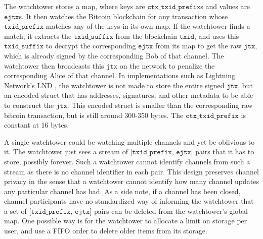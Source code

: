 The watchtower stores a map, where keys are $\texttt{ctx\_txid\_prefix}$s and values are $\texttt{ejtx}$s. It then watches the Bitcoin blockchain for any transaction whose $\texttt{txid\_prefix}$ matches any of the keys in its own map. If the watchtower finds a match, it extracts the $\texttt{txid\_suffix}$ from the blockchain $\texttt{txid}$, and uses this $\texttt{txid\_suffix}$ to decrypt the corresponding $\texttt{ejtx}$ from its map to get the raw $\texttt{jtx}$, which is already signed by the corresponding Bob of that channel. The watchtower then broadcasts this $\texttt{jtx}$ on the network to penalize the corresponding Alice of that channel. In implementations such as Lightning Network's LND \cite{lnd}, the watchtower is not made to store the entire signed $\texttt{jtx}$, but an encoded struct that has addresses, signatures, and other metadata to be able to construct the $\texttt{jtx}$. This encoded struct is smaller than the corresponding raw bitcoin transaction, but is still around 300-350 bytes. The $\texttt{ctx\_txid\_prefix}$ is constant at 16 bytes.

A single watchtower could be watching multiple channels and yet be oblivious to it. The watchtower just sees a stream of \sloppy $\texttt{[txid\_prefix, ejtx]}$ pairs that it has to store, possibly forever. Such a watchtower cannot identify channels from such a stream as there is no channel identifier in each pair. This design preserves channel privacy in the sense that a watchtower cannot identify how many channel updates any particular channel has had. As a side note, if a channel has been closed, channel participants have no standardized way of informing the watchtower that a set of $\texttt{[txid\_prefix, ejtx]}$ pairs can be deleted from the watchtower's global map. One possible way is for the watchtower to allocate a limit on storage per user, and use a FIFO order to delete older items from its storage.

